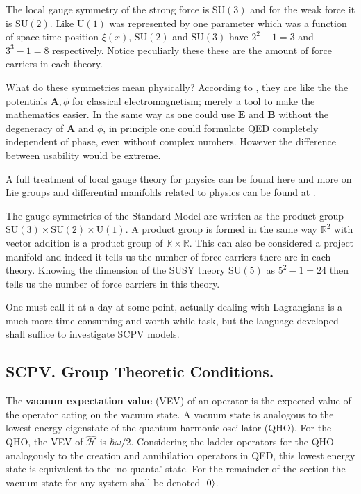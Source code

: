 The local gauge symmetry of the strong force is $\mathrm{SU}(3)$ and for the weak force it is $\mathrm{SU}(2)$. Like $\mathrm{U}(1)$ was represented by one parameter which was a function of space-time position $\xi(x)$, $\mathrm{SU}(2)$ and $\mathrm{SU}(3)$ have $2^2-1=3$ and $3^3-1=8$ respectively. Notice peculiarly these these are the amount of force carriers in each theory.

What do these symmetries mean physically? According to \cite{SCPV6}, they are like the the potentials $\mathbf{A}, \phi$ for classical electromagnetism; merely a tool to make the mathematics easier. In the same way as one could use $\mathbf{E}$ and $\mathbf{B}$ without the degeneracy of $\mathbf{A}$ and $\phi$, in principle one could formulate QED completely independent of phase, even without complex numbers.
However the difference between usability would be extreme.


A full treatment of local gauge theory for physics can be found here \cite{SCPV6} and more on Lie groups and differential manifolds related to physics can be found at \cite{SCPV3}. 

The gauge symmetries of the Standard Model are written as the product group $\mathrm{SU}(3)\times \mathrm{SU}(2)\times \mathrm{U}(1)$. A product group is formed in the same way $\mathbb{R}^2$ with vector addition is a product group of $\mathbb{R}\times\mathbb{R}$. This can also be considered a project manifold and indeed it tells us the number of force carriers there are in each theory. Knowing the dimension of the SUSY theory $\mathrm{SU}(5)$ as $5^2-1 = 24$ then tells us the number of force carriers in this theory.

One must call it at a day at some point, actually dealing with Lagrangians is a much more time consuming and worth-while task, but the language developed shall suffice to investigate SCPV models.

\subsection{SCPV. Group Theoretic Conditions.}
The \textbf{vacuum expectation value} (VEV) of an operator is the expected value of the operator acting on the vacuum state. A vacuum state is analogous to the lowest energy eigenstate of the quantum harmonic oscillator (QHO). For the QHO, the VEV of $\hat{\mathcal{H}}$ is $\hbar \omega /2$. Considering the ladder operators for the QHO analogously to the creation and annihilation operators in QED, this lowest energy state is equivalent to the `no quanta' state. For the remainder of the section the vacuum state for any system shall be denoted  $\ket{0}$.


